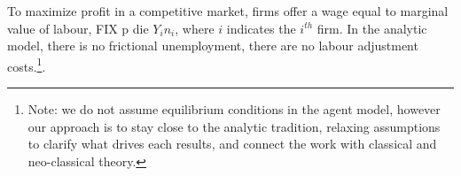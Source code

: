 

To maximize profit 
in a competitive market, firms offer a wage equal to marginal value of labour, 
FIX p die ${Y_i}{n_i}$, where $i$ indicates the $i^{th}$ firm. In the analytic model, there is no frictional unemployment, there are no labour adjustment costs.\footnote{Note: we do not assume equilibrium conditions in the agent model, however our approach is to stay close to the analytic tradition, relaxing assumptions to clarify what drives each results, and connect the work with classical and neo-classical theory.}. %

